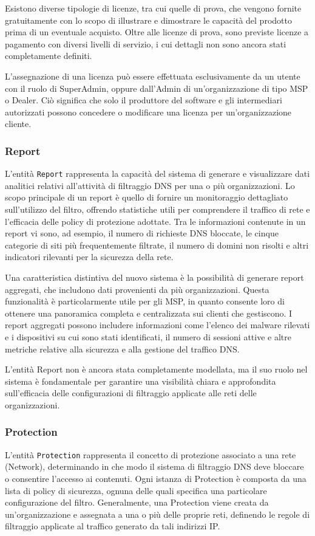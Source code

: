 Esistono diverse tipologie di licenze, tra cui quelle di prova, che vengono fornite gratuitamente con lo scopo di illustrare e dimostrare le capacità del prodotto prima di un eventuale acquisto. Oltre alle licenze di prova, sono previste licenze a pagamento con diversi livelli di servizio, i cui dettagli non sono ancora stati completamente definiti.

L'assegnazione di una licenza può essere effettuata esclusivamente da un utente con il ruolo di SuperAdmin, oppure dall’Admin di un’organizzazione di tipo MSP o Dealer. Ciò significa che solo il produttore del software e gli intermediari autorizzati possono concedere o modificare una licenza per un'organizzazione cliente.

\subsubsection{Report}
L'entità \texttt{Report} rappresenta la capacità del sistema di generare e visualizzare dati analitici relativi all'attività di filtraggio DNS per una o più organizzazioni. Lo scopo principale di un report è quello di fornire un monitoraggio dettagliato sull'utilizzo del filtro, offrendo statistiche utili per comprendere il traffico di rete e l'efficacia delle policy di protezione adottate. Tra le informazioni contenute in un report vi sono, ad esempio, il numero di richieste DNS bloccate, le cinque categorie di siti più frequentemente filtrate, il numero di domini non risolti e altri indicatori rilevanti per la sicurezza della rete.

Una caratteristica distintiva del nuovo sistema è la possibilità di generare report aggregati, che includono dati provenienti da più organizzazioni. Questa funzionalità è particolarmente utile per gli MSP, in quanto consente loro di ottenere una panoramica completa e centralizzata sui clienti che gestiscono. I report aggregati possono includere informazioni come l’elenco dei malware rilevati e i dispositivi su cui sono stati identificati, il numero di sessioni attive e altre metriche relative alla sicurezza e alla gestione del traffico DNS.

L'entità Report non è ancora stata completamente modellata, ma il suo ruolo nel sistema è fondamentale per garantire una visibilità chiara e approfondita sull’efficacia delle configurazioni di filtraggio applicate alle reti delle organizzazioni.

\subsubsection{Protection}
L'entità \texttt{Protection} rappresenta il concetto di protezione associato a una rete (Network), determinando in che modo il sistema di filtraggio DNS deve bloccare o consentire l'accesso ai contenuti. Ogni istanza di Protection è composta da una lista di policy di sicurezza, ognuna delle quali specifica una particolare configurazione del filtro. Generalmente, una Protection viene creata da un'organizzazione e assegnata a una o più delle proprie reti, definendo le regole di filtraggio applicate al traffico generato da tali indirizzi IP.

